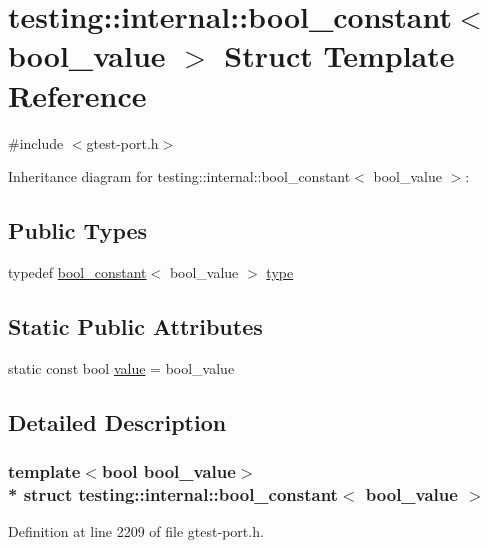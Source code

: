 \hypertarget{structtesting_1_1internal_1_1bool__constant}{}\section{testing\+:\+:internal\+:\+:bool\+\_\+constant$<$ bool\+\_\+value $>$ Struct Template Reference}
\label{structtesting_1_1internal_1_1bool__constant}


{\ttfamily \#include $<$gtest-\/port.\+h$>$}



Inheritance diagram for testing\+:\+:internal\+:\+:bool\+\_\+constant$<$ bool\+\_\+value $>$\+:
\subsection*{Public Types}
\begin{DoxyCompactItemize}
\item 
typedef \hyperlink{structtesting_1_1internal_1_1bool__constant}{bool\+\_\+constant}$<$ bool\+\_\+value $>$ \hyperlink{structtesting_1_1internal_1_1bool__constant_aba6d09ecf7eecea6c93480f0d627a167}{type}
\end{DoxyCompactItemize}
\subsection*{Static Public Attributes}
\begin{DoxyCompactItemize}
\item 
static const bool \hyperlink{structtesting_1_1internal_1_1bool__constant_a499fba6576296b04d99690a486424b32}{value} = bool\+\_\+value
\end{DoxyCompactItemize}


\subsection{Detailed Description}
\subsubsection*{template$<$bool bool\+\_\+value$>$\\*
struct testing\+::internal\+::bool\+\_\+constant$<$ bool\+\_\+value $>$}



Definition at line 2209 of file gtest-\/port.\+h.



